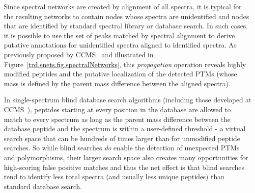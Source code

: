 \documentclass[arial,11pt]{article}
\begin{document}
Since spectral networks are created by alignment of all spectra, it is typical for the resulting networks to contain nodes whose spectra are unidentified and nodes that are identified by standard spectral library or database search. In such cases, it is possible to use the set of peaks matched by spectral alignment to derive putative annotations for unidentified spectra aligned to identified spectra. As previously proposed by CCMS~\cite{bandeira07pnas} and illustrated in Figure~\ref{trd.snets.fig.spectralNetworks}, this {\em propagation} operation reveals highly modified peptides and the putative localization of the detected PTMs (whose mass is defined by the parent mass difference between the aligned spectra).

In single-spectrum blind database search algorithms (including those developed at CCMS~\cite{pevzner01,tsur05,na11}), peptides starting at every position in the database are allowed to match to every spectrum as long as the parent mass difference between the database peptide and the spectrum is within a user-defined threshold \-- a virtual search space that can be hundreds of times larger than for unmodified peptide searches. So while blind searches {\em do} enable the detection of unexpected PTMs and polymorphisms, their larger search space also creates many opportunities for high-scoring false positive matches and thus the net effect is that blind searches tend to identify less total spectra (and usually less unique peptides) than standard database search.
\end{document}
